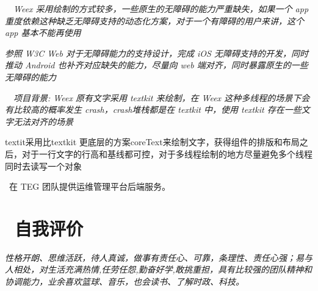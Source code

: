 \documentclass{resume}
\begin{document}
\
\
\textit{Weex 采用绘制的方式较多，一些原生的无障碍的能力严重缺失，如果一个 app 重度依赖这种缺乏无障碍支持的动态化方案，对于一个有障碍的用户来讲，这个 app 基本不能再使用}

\textit{参照 W3C Web 对于无障碍能力的支持设计，完成 iOS 无障碍支持的开发，同时推动 Android 也补齐对应缺失的能力，尽量向 web 端对齐，同时暴露原生的一些无障碍的能力}



\
\
\textit{项目背景: Weex 原有文字采用 textkit 来绘制，在 Weex 这种多线程的场景下会有比较高的概率发生 crash，crash堆栈都是在 textkit 中，使用 textkit 存在一些文字无法对齐的场景}

textit{采用比textkit 更底层的方案coreText来绘制文字，获得组件的排版和布局之后，对于一行文字的行高和基线都可控，对于多线程绘制的地方尽量避免多个线程同时去读写一个对象}


\role{实习服务端开发工程师}\
在 TEG 团队提供运维管理平台后端服务。


\section{\faInfo\ 自我评价}

\textit{
  性格开朗、思维活跃，待人真诚，做事有责任心、可靠，条理性、责任心强；易与人相处，对生活充满热情,任劳任怨,勤奋好学,敢挑重担，具有比较强的团队精神和协调能力，业余喜欢篮球、音乐，也会读书、了解时政、科技。
}


%
%
\end{document}
